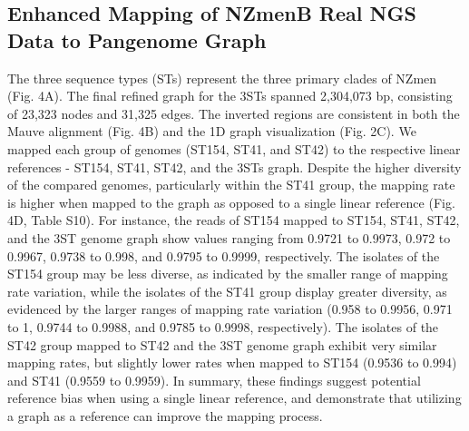\subsection{Enhanced Mapping of NZmenB Real NGS Data to Pangenome Graph}
The three sequence types (STs) represent the three primary clades of NZmen (Fig. 4A). The final refined graph for the 3STs spanned 2,304,073 bp, consisting of 23,323 nodes and 31,325 edges. The inverted regions are consistent in both the Mauve alignment (Fig. 4B) and the 1D graph visualization (Fig. 2C).
We mapped each group of genomes (ST154, ST41, and ST42) to the respective linear references - ST154, ST41, ST42, and the 3STs graph. Despite the higher diversity of the compared genomes, particularly within the ST41 group, the mapping rate is higher when mapped to the graph as opposed to a single linear reference (Fig. 4D, Table S10). For instance, the reads of ST154 mapped to ST154, ST41, ST42, and the 3ST genome graph show values ranging from 0.9721 to 0.9973, 0.972 to 0.9967, 0.9738 to 0.998, and 0.9795 to 0.9999, respectively. The isolates of the ST154 group may be less diverse, as indicated by the smaller range of mapping rate variation, while the isolates of the ST41 group display greater diversity, as evidenced by the larger ranges of mapping rate variation (0.958 to 0.9956, 0.971 to 1, 0.9744 to 0.9988, and 0.9785 to 0.9998, respectively). The isolates of the ST42 group mapped to ST42 and the 3ST genome graph exhibit very similar mapping rates, but slightly lower rates when mapped to ST154 (0.9536 to 0.994) and ST41 (0.9559 to 0.9959). 
In summary, these findings suggest potential reference bias when using a single linear reference, and demonstrate that utilizing a graph as a reference can improve the mapping process.
